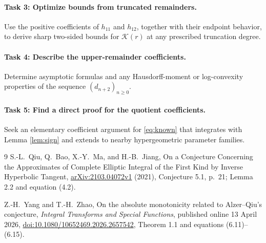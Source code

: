\documentclass[11pt]{article}
\begin{document}
\paragraph{Task 3: Optimize bounds from truncated remainders.}
Use the positive coefficients of \(h_{11}\) and \(h_{12}\), together
with their endpoint behavior, to derive sharp two-sided bounds for
\(\mathcal K(r)\) at any prescribed truncation degree.

\paragraph{Task 4: Describe the upper-remainder coefficients.}
Determine asymptotic formulas and any Hausdorff-moment or
log-convexity properties of the sequence \((d_{n+2})_{n\geq0}\).

\paragraph{Task 5: Find a direct proof for the quotient coefficients.}
Seek an elementary coefficient argument for \eqref{eq:known}
that integrates with Lemma \ref{lem:sign} and extends to nearby
hypergeometric parameter families.

\begin{thebibliography}{9}
S.-L.\ Qiu, Q.\ Bao, X.-Y.\ Ma, and H.-B.\ Jiang,
On a Conjecture Concerning the Approximates of Complete Elliptic
Integral of the First Kind by Inverse Hyperbolic Tangent,
\href{https://arxiv.org/abs/2103.04072}{arXiv:2103.04072v1} (2021),
Conjecture 5.1, p.~21; Lemma 2.2 and equation (4.2).

Z.-H.\ Yang and T.-H.\ Zhao,
On the absolute monotonicity related to Alzer--Qiu's conjecture,
\emph{Integral Transforms and Special Functions}, published online
13 April 2026,
\href{https://doi.org/10.1080/10652469.2026.2657542}
{doi:10.1080/10652469.2026.2657542},
Theorem 1.1 and equations (6.11)--(6.15).
\end{thebibliography}
\end{document}
